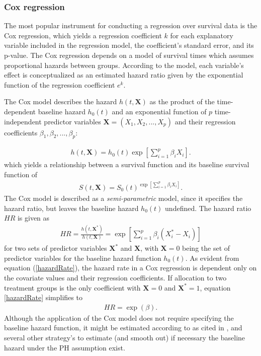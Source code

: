 \documentclass[main.tex]{subfiles}
\begin{document}
\subsubsection{Cox regression}
The most popular instrument for conducting a regression over survival data is the Cox regression, which yields a regression coefficient $k$ for each explanatory variable included in the regression model, the coefficient's standard error, and its p-value. The Cox regression depends on a model of survival times which assumes proportional hazards between groups. According to the model, each variable's effect is conceptualized as an estimated hazard ratio given by the exponential function of the regression coefficient $e^k$.

The Cox model describes the hazard $h(t, \textbf{X})$ as the product of the time-dependent baseline hazard $h_0(t)$ and an exponential function of $p$ time-independent predictor variables $\textbf{X} = (X_1, X_2, ..., X_p)$ and  their regression coefficients $\beta_1, \beta_2, ..., \beta _p$:

\begin{align}
h(t, \textbf{X}) = h_0(t)\exp{\left[\sum_{i=1}^p\beta_i X_i\right]}.
\end{align}
which yields a relationship between a survival function and its baseline survival function of
\begin{align}
S(t, \textbf{X}) = S_0(t)^{\exp{\left[\sum_{i=1}^p\beta_i X_i\right]}}.
\end{align}
The Cox model is described as a \textit{semi-parametric} model, since it specifies the hazard ratio, but leaves the baseline hazard $h_0(t)$ undefined. The hazard ratio $HR$ is given as
\begin{align}\label{hazardRate}
HR = \frac{h(t, \textbf{X}^*)}{h(t, \textbf{X})} = \exp{\left[ \sum_{i=1}^p \beta_i(X^*_i - X_i)\right]}
\end{align}
for two sets of predictor variables $\textbf{X}^*$ and $\textbf{X}$, with $\textbf{X} = 0$ being the set of predictor variables for the baseline hazard function $h_0(t)$. As evident from equation (\ref{hazardRate}), the hazard rate in a Cox regression is dependent only on the covariate values and their regression coefficients. If allocation to two treatment groups is the only coefficient with $\textbf{X} = 0$ and $\textbf{X}^*=1$, equation \ref{hazardRate} simplifies to
\begin{align}
HR = \exp({\beta}).
\end{align}
Although the application of the Cox model does not require specifying the baseline hazard function, it might be estimated according to \textcite[p.83]{kalbfleisch2011statistical} as cited in \textcite{Royston2002-ud}, and several other strategy's to estimate (and smooth out) if necessary the baseline hazard under the PH assumption exist.
\end{document}
